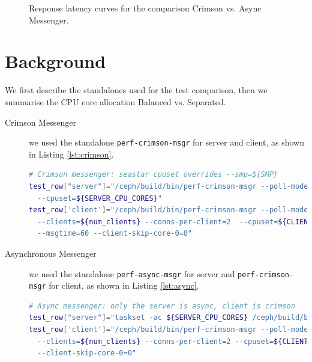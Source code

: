 \begin{figure}[!ht]
\begin{minipage}{.5\textwidth}
  \end{minipage}%
  \caption{Response latency curves for the comparison Crimson vs. Async Messenger.}
  \label{figure:crimson_vs_async-rc}
\end{figure}


\section{Background}

We first describe the standalones used for the test comparison, then we
summarise the CPU core allocation Balanced vs. Separated.
\begin{description}
\item [Crimson Messenger] we used the
  standalone \texttt{perf-crimson-msgr} for server and client, as shown in Listing \ref{lst:crimson}.

\begin{lstlisting}[language=sh, caption=Invocation of the Crimson Messenger, label=lst:crimson]
# Crimson messenger: seastar cpuset overrides --smp=${SMP}
test_row["server"]="/ceph/build/bin/perf-crimson-msgr --poll-mode --mode=2 --server-fixed-cpu=0\
  --cpuset=${SERVER_CPU_CORES}"
test_row['client']="/ceph/build/bin/perf-crimson-msgr --poll-mode --mode=1 --depth=512\
  --clients=${num_clients} --conns-per-client=2  --cpuset=${CLIENT_CPU_CORES} \
  --msgtime=60 --client-skip-core-0=0"
\end{lstlisting}

\item [Asynchronous Messenger] we used the standalone \texttt{perf-async-msgr}
for server and \texttt{perf-crimson-msgr} for client, as shown in Listing \ref{lst:async}. 

\begin{lstlisting}[language=sh, caption=Invocation of the Asynchronous Messenger, label=lst:async]
# Async messenger: only the server is async, client is crimson
test_row["server"]="taskset -ac ${SERVER_CPU_CORES} /ceph/build/bin/perf-async-msgr --threads=${SMP}"
test_row['client']="/ceph/build/bin/perf-crimson-msgr --poll-mode --mode=1 --depth=512\
  --clients=${num_clients} --conns-per-client=2 --cpuset=${CLIENT_CPU_CORES} --msgtime=60\
  --client-skip-core-0=0"
\end{lstlisting}

\end{description}

